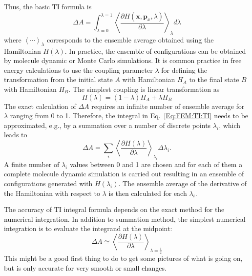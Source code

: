 Thus, the basic TI formula is
\begin{equation}
\Delta A = \int_{\lambda=0}^{\lambda=1}\left \langle \frac{\partial{H(\mathbf{x},\mathbf{p}_{x},\lambda)}}{\partial{\lambda}} \right \rangle_{\lambda} d\lambda
\label{Eq:FEM:TI:TI}
\end{equation} 
where $\left \langle \cdots \right \rangle _{\lambda}$ corresponds to the ensemble average obtained using the Hamiltonian $H(\lambda)$. In practice, the ensemble of configurations can be obtained by molecule dynamic or Monte Carlo simulations. It is common practice in free energy calculations to use the coupling parameter $\lambda$ for defining the transformation from the initial state $A$ with Hamiltonian $H_{A}$ to the final state $B$ with Hamiltonian $H_{B}$. The simplest coupling is linear transformation as
\begin{equation}
H(\lambda) = (1-\lambda) H_{A} + \lambda H_{B}
\end{equation}
The exact calculation of $\Delta A$ requires an infinite number of ensemble average for $\lambda$ ranging from 0 to 1.
Therefore, the integral in Eq.~\ref{Eq:FEM:TI:TI} needs to be approximated, e.g., by a summation over a number of discrete points $\lambda_{i}$, which leads to 
\begin{equation}
\Delta A = \sum_{i}^{}\left \langle \frac{\partial{H(\lambda)}}{\partial{\lambda}} \right \rangle_{\lambda_{i}} \Delta\lambda_{i}.
\label{Eq:FEM:TI:dTI}
\end{equation} 
A finite number of $\lambda_{i}$ values between 0 and 1 are chosen and for each of them a complete molecule dynamic simulation is carried out resulting in an ensemble of configurations generated with $H(\lambda_{i})$.
The ensemble average of the derivative of the Hamiltonian with respect to $\lambda$ is then calculated for each $\lambda_{i}$.
	
The accuracy of TI integral formula depends on the exact method for the numerical integration.\cite{PaliwalJCTC2011} In addition to summation method, the simplest numerical integration is to evaluate the integrand at the midpoint:
\begin{equation}
\Delta A \simeq \left \langle \frac{\partial{H(\lambda)}}{\partial{\lambda}} \right \rangle_{\lambda=\frac{1}{2}}
\label{Eq:FEM:TI:TI1}
\end{equation} 
This might be a good first thing to do to get some pictures of what is going on, but is only accurate for very smooth or small changes. %
	
